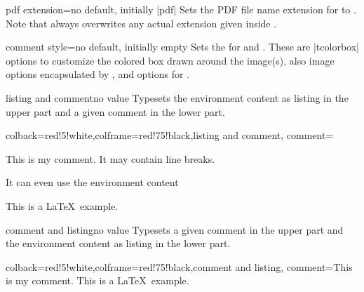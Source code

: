 \clearpage


\begin{docTcbKey}[][doc new=2014-11-14]{pdf extension}{=}{no default, initially |pdf|}
  Sets the PDF file name extension for  to .
  Note that  always overwrites any actual extension given
  inside .
\end{docTcbKey}


\begin{docTcbKey}[][doc new=2014-11-14]{comment style}{=}{no default, initially empty}
  Sets the  for  and .
  These are |tcolorbox| options to customize the colored box drawn around the
  image(s), also image options encapsulated by ,
  and  options for .
\end{docTcbKey}


\begin{docTcbKey}{listing and comment}{}{no value}
  Typesets the environment content as listing in the upper part and
  a given comment in the lower part.
\begin{dispExample}
\begin{tcblisting}{colback=red!5!white,colframe=red!75!black,listing and comment,
  comment={This is my comment. It may contain line breaks.\par
    It can even use the environment content
    \flqq\ignorespaces\tcbuselistingtext\unskip\frqq}}
This is a \LaTeX\ example.
\end{tcblisting}
\end{dispExample}
\end{docTcbKey}

\enlargethispage*{10mm}
\begin{docTcbKey}{comment and listing}{}{no value}
  Typesets a given comment in the upper part and
  the environment content as listing in the lower part.
\begin{dispExample}
\begin{tcblisting}{colback=red!5!white,colframe=red!75!black,comment and listing,
comment={This is my comment.}}
This is a \LaTeX\ example.
\end{tcblisting}
\end{dispExample}
\end{docTcbKey}


